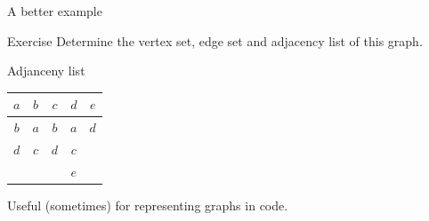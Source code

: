 \begin{frame}{A better example}
  \begin{adjustbox}{max width={0.9\textwidth},center} 
  \end{adjustbox}
  \vspace{0.1cm}
  \begin{block}{Exercise}
  Determine the vertex set, edge set and adjacency list of this graph.
  \end{block}
  
\end{frame}

\begin{frame}{Adjanceny list}
  \begin{center}
    \begin{tabular}{c@{\hskip 1cm}c@{\hskip 1cm}c@{\hskip 1cm}c@{\hskip 1cm}c}
      $a$ & $b$ & $c$ & $d$ & $e$ \\
      \midrule
      $b$ & $a$ & $b$ & $a$ & $d$ \\
      $d$ & $c$ & $d$ & $c$ &     \\
          &     &     & $e$ &     \\
    \end{tabular}
  \end{center}
  Useful (sometimes) for representing graphs in code.
\end{frame}


